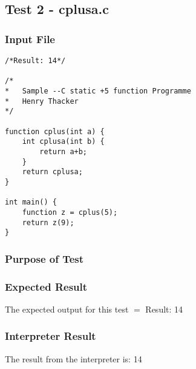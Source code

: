 \subsection{Test 2 - cplusa.c}
\subsubsection{Input File}
\begin{lstlisting}[showstringspaces=false,breaklines=true,backgroundcolor=\color{light-gray}, captionpos=b]
/*Result: 14*/

/*
*	Sample --C static +5 function Programme
*	Henry Thacker
*/

function cplus(int a) { 
	int cplusa(int b) { 
		return a+b; 
	} 
	return cplusa;
}

int main() {
	function z = cplus(5);
	return z(9);
}
\end{lstlisting}\subsubsection{Purpose of Test}

\subsubsection{Expected Result}
The expected output for this test $=$ Result: 14
\subsubsection{Interpreter Result}
The result from the interpreter is: 14
